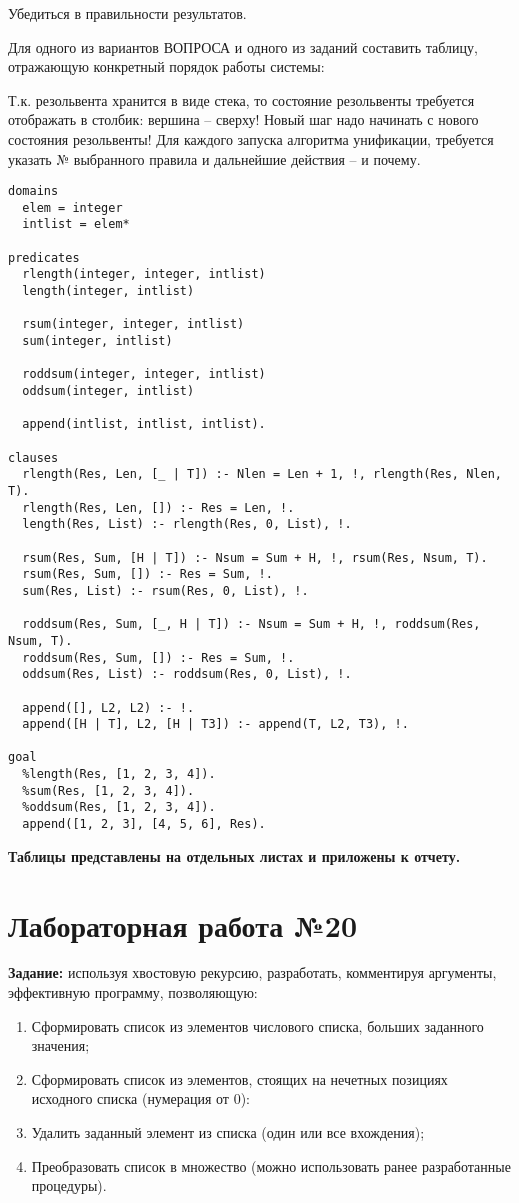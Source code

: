 Убедиться в правильности результатов.

Для одного из вариантов ВОПРОСА и одного из заданий составить таблицу, отражающую конкретный порядок работы системы:

Т.к. резольвента хранится в виде стека, то состояние резольвенты требуется отображать в столбик: вершина – сверху! Новый шаг надо начинать с нового состояния резольвенты! Для каждого запуска алгоритма унификации, требуется указать № выбранного правила и дальнейшие действия – и почему.

\begin{lstlisting}
domains
  elem = integer
  intlist = elem*

predicates
  rlength(integer, integer, intlist)
  length(integer, intlist)

  rsum(integer, integer, intlist)
  sum(integer, intlist)

  roddsum(integer, integer, intlist)
  oddsum(integer, intlist)

  append(intlist, intlist, intlist).

clauses
  rlength(Res, Len, [_ | T]) :- Nlen = Len + 1, !, rlength(Res, Nlen, T).
  rlength(Res, Len, []) :- Res = Len, !.
  length(Res, List) :- rlength(Res, 0, List), !.

  rsum(Res, Sum, [H | T]) :- Nsum = Sum + H, !, rsum(Res, Nsum, T).
  rsum(Res, Sum, []) :- Res = Sum, !.
  sum(Res, List) :- rsum(Res, 0, List), !.

  roddsum(Res, Sum, [_, H | T]) :- Nsum = Sum + H, !, roddsum(Res, Nsum, T).
  roddsum(Res, Sum, []) :- Res = Sum, !.
  oddsum(Res, List) :- roddsum(Res, 0, List), !.

  append([], L2, L2) :- !.
  append([H | T], L2, [H | T3]) :- append(T, L2, T3), !.

goal
  %length(Res, [1, 2, 3, 4]).
  %sum(Res, [1, 2, 3, 4]).
  %oddsum(Res, [1, 2, 3, 4]).
  append([1, 2, 3], [4, 5, 6], Res).
\end{lstlisting}

\textbf{Таблицы представлены на отдельных листах и приложены к отчету.}

\chapter{Лабораторная работа №20}

\textbf{Задание:} используя хвостовую рекурсию, разработать, комментируя аргументы, эффективную программу, позволяющую:
\begin{enumerate}
    \item Сформировать список из элементов числового списка, больших заданного значения;
    \item Сформировать список из элементов, стоящих на нечетных позициях исходного списка (нумерация от 0):
    \item Удалить заданный элемент из списка (один или все вхождения);
    \item Преобразовать список в множество (можно использовать ранее разработанные процедуры).
\end{enumerate}

